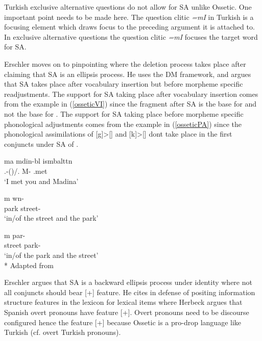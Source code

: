 Turkish exclusive alternative questions do not allow for SA unlike Ossetic. One important point needs to be made here. The question clitic \textit{=mI} in Turkish is a focusing element which draws focus to the preceding argument it is attached to. In exclusive alternative questions the question clitic \textit{=mI} focuses the target word for SA.

Erschler moves on to pinpointing where the deletion process takes place after claiming that SA is an ellipsis process. He uses the DM framework, and argues that SA takes place after vocabulary insertion but before morpheme specific readjustments. The support for SA taking place after vocabulary insertion comes from the example in (\ref{osseticVI}) since the fragment after SA is the base for {\Sup} and not the base for {\Nom}. The support for SA taking place before morpheme specific phonological adjustments comes from the example in (\ref{osseticPA}) since the phonological assimilations of [g]\textgreater[\textdyoghlig] and [k]\textgreater[\textteshlig] dont take place in the first conjuncts under SA of {\Obl}.

\begin{exe}
    \ex \begin{xlist}
    \ex \label{osseticVI}
     {\textturna ma} {m\textturna din\textturna-b\textturna l} {is\textturna mbaltt\textturna n} \\ 
    {\Ssg}.{\Obl}-({\Sup})/{\Ssg}.{\Nom} {\And} M-{\Sup} {\Fsg}.met \\
    \glt `I met you and Madina'
    
    \ex \label{osseticPA}
    \begin{xlisti}
    \ex {} {\textturna m\textturna} {w\textschwa n\textdyoghlig-\textschwa} \\ 
    park {\And} street-{\Obl} \\
    \glt `in/of the street and the park'
    
    \ex {} {\textturna m\textturna} {par\textteshlig-\textschwa} \\ 
    street {\And} park-{\Obl} \\
    \glt `in/of the park and the street'\\*
    \hfill Adapted from \cite{erschler2018suspended}
    \end{xlisti}
    \end{xlist}
\end{exe}

Erschler argues that SA is a backward ellipsis process under identity where not all conjuncts should bear \textsc{[+{\Emp}]} feature. He cites \cite{herbeck2016controlling} in defense of positing information structure features in the lexicon for lexical items where Herbeck argues that Spanish overt pronouns have feature \textsc{[+{\Foc}]}. Overt pronouns need to be discourse configured hence the feature \textsc{[+{\Emp}]} because Ossetic is a pro-drop language like Turkish (cf. \cite{ozturk2002turkish} overt Turkish pronouns). 

